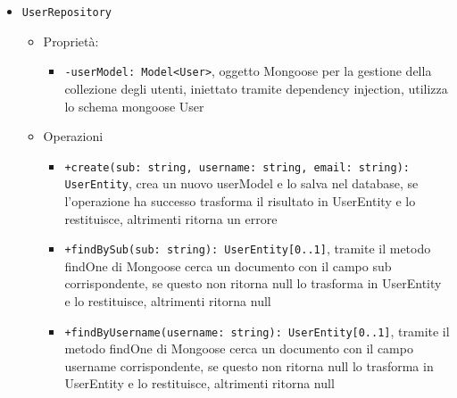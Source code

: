 \documentclass[a4paper, 11pt]{article}
\begin{document}
\begin{itemize}
\begin{itemize}
			\item \texttt{UserRepository}
				\begin{itemize}
					\item Proprietà:
						\begin{itemize}
							\item \texttt{-userModel: Model<User>}, oggetto Mongoose per la gestione della collezione degli utenti, iniettato tramite dependency injection, utilizza lo schema mongoose User
						\end{itemize}
					\item Operazioni
						\begin{itemize}
							\item \texttt{+create(sub: string, username: string, email: string): UserEntity}, crea un nuovo userModel e lo salva nel database, se l'operazione ha successo trasforma il risultato in UserEntity e lo restituisce, altrimenti ritorna un errore
							\item \texttt{+findBySub(sub: string): UserEntity[0..1]}, tramite il metodo findOne di Mongoose cerca un documento con il campo sub corrispondente, se questo non ritorna null lo trasforma in UserEntity e lo restituisce, altrimenti ritorna null
							\item \texttt{+findByUsername(username: string): UserEntity[0..1]}, tramite il metodo findOne di Mongoose cerca un documento con il campo username corrispondente, se questo non ritorna null lo trasforma in UserEntity e lo restituisce, altrimenti ritorna null
						\end{itemize}
				\end{itemize}
		\end{itemize}
\end{itemize}
\end{document}
